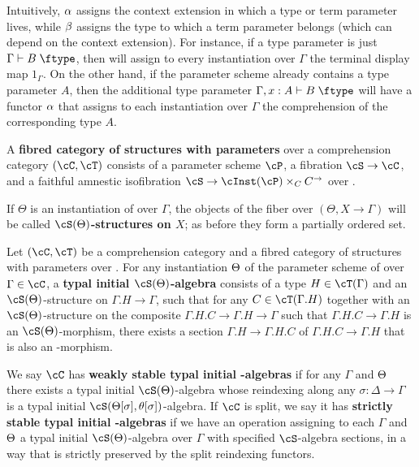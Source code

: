 \documentclass[referee]{psp}
\let\S\cS
\let\P\cP
\let\C\cC
\let\T\cT
\let\type\fibtype
\begin{document}
Intuitively, $\alpha$ assigns the context extension in which a type or term parameter lives, while $\beta$ assigns the type to which a term parameter belongs (which can depend on the context extension).
For instance, if a type parameter is just $\Gamma\types B\type$, then \al will assign to every instantiation over $\Gamma$ the terminal display map $1_\Gamma$.
On the other hand, if the parameter scheme \P already contains a type parameter $A$, then the additional type parameter $\Gamma,x:A \types B\type$ will have a functor $\alpha$ that assigns to each instantiation over $\Gamma$ the comprehension of the corresponding type $A$.

\begin{defn}
  A \textbf{fibred category of structures with parameters} over a comprehension category $(\C,\T)$ consists of a parameter scheme $\P$, a fibration $\S\to \C$, and a faithful amnestic isofibration $\S \to \cInst(\P)\times_C C^\to$ over \C.
\end{defn}

If $\Theta$ is an instantiation of \P over $\Gamma$, the objects of the fiber over $(\Theta,X\to\Gamma)$ will be called \textbf{$\S(\Th)$-structures on $X$}; as before they form a partially ordered set.

\begin{defn}
  Let $(\C,\T)$ be a comprehension category and \S a fibred category of structures with parameters over \C.
  For any instantiation $\Theta$ of the parameter scheme of \S over $\Gamma\in \C$, a \textbf{typal initial $\S(\Th)$-algebra} consists of a type $H\in\T(\Gamma)$ and an $\S(\Th)$-structure on $\Gamma.H\to \Gamma$, such that for any $C\in\T(\Gamma.H)$ together with an $\S(\Th)$-structure on the composite $\Gamma.H.C\to\Gamma.H\to\Gamma$ such that $\Gamma.H.C\to\Gamma.H$ is an $\S(\Th)$-morphism, there exists a section $\Gamma.H \to \Gamma.H.C$ of $\Gamma.H.C\to\Gamma.H$ that is also an \S-morphism.

  We say $\C$ has \textbf{weakly stable typal initial \S-algebras} if for any $\Gamma$ and $\Theta$ there exists a typal initial $\S(\Th)$-algebra whose reindexing along any $\sigma:\Delta\to\Gamma$ is a typal initial $\S(\Theta[\sigma],\theta[\sigma])$-algebra.
  If $\C$ is split, we say it has \textbf{strictly stable typal initial \S-algebras} if we have an operation assigning to each $\Gamma$ and $\Theta$ a typal initial $\S(\Th)$-algebra over $\Gamma$ with specified $\S$-algebra sections, in a way that is strictly preserved by the split reindexing functors.
\end{defn}
\end{document}
